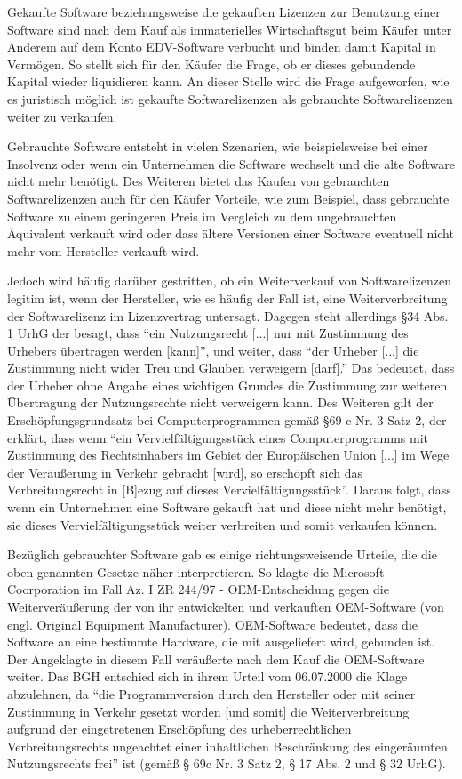 Gekaufte Software beziehungsweise die gekauften Lizenzen zur Benutzung einer Software sind nach dem Kauf als immaterielles Wirtschaftsgut beim Käufer unter Anderem
auf dem Konto EDV-Software verbucht und binden damit Kapital in Vermögen. So stellt sich für den Käufer die Frage, ob er dieses gebundende Kapital wieder liquidieren kann.
An dieser Stelle wird die Frage aufgeworfen, wie es juristisch möglich ist gekaufte Softwarelizenzen als gebrauchte Softwarelizenzen weiter zu verkaufen.

Gebrauchte Software entsteht in vielen Szenarien, wie beispielsweise bei einer Insolvenz oder wenn ein Unternehmen die Software wechselt und die alte Software nicht mehr benötigt.
Des Weiteren bietet das Kaufen von gebrauchten Softwarelizenzen auch für den Käufer Vorteile, wie zum Beispiel, dass gebrauchte Software zu einem geringeren Preis im Vergleich
zu dem ungebrauchten Äquivalent verkauft wird oder dass ältere Versionen einer Software eventuell nicht mehr vom Hersteller verkauft wird.

Jedoch wird häufig darüber gestritten, ob ein Weiterverkauf von Softwarelizenzen legitim ist, wenn der Hersteller, wie es häufig der Fall ist, eine Weiterverbreitung der
Softwarelizenz im Lizenzvertrag untersagt. Dagegen steht allerdings §34 Abs. 1 UrhG der besagt, dass “ein Nutzungsrecht [...] nur mit Zustimmung des Urhebers übertragen werden [kann]”,
und weiter, dass “der Urheber [...] die Zustimmung nicht wider Treu und Glauben verweigern [darf].” Das bedeutet, dass der Urheber ohne Angabe eines wichtigen
Grundes die Zustimmung zur weiteren Übertragung der Nutzungsrechte nicht verweigern kann. Des Weiteren gilt der Erschöpfungsgrundsatz bei Computerprogrammen gemäß §69 c Nr. 3 Satz 2,
der erklärt, dass wenn “ein Vervielfältigungsstück eines Computerprogramms mit Zustimmung des Rechtsinhabers im Gebiet der Europäischen Union [...] im Wege der Veräußerung in Verkehr
gebracht [wird], so erschöpft sich das Verbreitungsrecht in [B]ezug auf dieses Vervielfältigungsstück”. Daraus folgt, dass wenn ein Unternehmen eine Software gekauft hat und diese
nicht mehr benötigt, sie dieses Vervielfältigungsstück weiter verbreiten und somit verkaufen können.

Bezüglich gebrauchter Software gab es einige richtungsweisende Urteile, die die oben genannten Gesetze näher interpretieren. So klagte die Microsoft Coorporation im Fall Az. I ZR 244/97 -
OEM-Entscheidung gegen die Weiterveräußerung der von ihr entwickelten und verkauften OEM-Software (von engl. Original Equipment Manufacturer). OEM-Software bedeutet,
dass die Software an eine bestimmte Hardware, die mit ausgeliefert wird, gebunden ist. Der Angeklagte in diesem Fall veräußerte nach dem Kauf die OEM-Software weiter.
Das BGH entschied sich in ihrem Urteil vom 06.07.2000 die Klage abzulehnen, da “die Programmversion durch den Hersteller oder mit seiner Zustimmung in Verkehr gesetzt worden
[und somit] die Weiterverbreitung aufgrund der eingetretenen Erschöpfung des urheberrechtlichen Verbreitungsrechts ungeachtet einer inhaltlichen Beschränkung des eingeräumten
Nutzungsrechts frei” ist (gemäß § 69c Nr. 3 Satz 2, § 17 Abs. 2 und § 32 UrhG).

